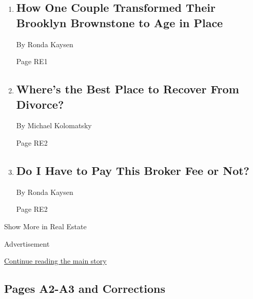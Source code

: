 \begin{enumerate}
\def\labelenumi{\arabic{enumi}.}
\item
  \href{/2020/02/14/realestate/how-one-couple-transformed-their-brooklyn-brownstone-to-age-in-place.html}{}

  \hypertarget{how-one-couple-transformed-their-brooklyn-brownstone-to-age-in-place}{%
  \subsection{How One Couple Transformed Their Brooklyn Brownstone to
  Age in
  Place}\label{how-one-couple-transformed-their-brooklyn-brownstone-to-age-in-place}}

  By Ronda Kaysen

  Page RE1
\item
  \href{/2020/02/13/realestate/wheres-the-best-place-to-recover-from-divorce.html}{}

  \hypertarget{wheres-the-best-place-to-recover-from-divorce}{%
  \subsection{Where's the Best Place to Recover From
  Divorce?}\label{wheres-the-best-place-to-recover-from-divorce}}

  By Michael Kolomatsky

  Page RE2
\item
  \href{/2020/02/15/realestate/do-i-have-to-pay-this-broker-fee-or-not.html}{}

  \hypertarget{do-i-have-to-pay-this-broker-fee-or-not}{%
  \subsection{Do I Have to Pay This Broker Fee or
  Not?}\label{do-i-have-to-pay-this-broker-fee-or-not}}

  By Ronda Kaysen

  Page RE2
\end{enumerate}

Show More in Real Estate

Advertisement

\protect\hyperlink{after-mid8}{Continue reading the main story}

\hypertarget{pages-a2-a3-and-corrections}{%
\subsection{Pages A2-A3 and
Corrections}\label{pages-a2-a3-and-corrections}}


